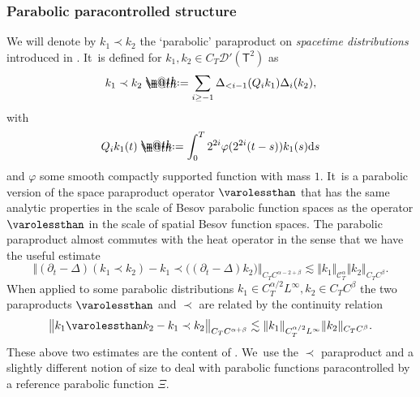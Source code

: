 \documentclass[10pt]{amsart}
\makeatletter
\theoremstyle{definition}
\newcommand{\mcD}{\mathcal{D}}
\newcommand{\scrC}{\ensuremath{\mathscr{C}}}
\newcommand*{\defeq}{\mathrel{\rlap{%
\raisebox{0.3ex}{$\m@th\cdot$}}%
\raisebox{-0.3ex}{$\m@th\cdot$}}%
=}
\newcommand{\dd}{\textup{d}}
\newcommand{\norme}[1]{\Vert #1 \Vert}
\makeatother
\begin{document}
\subsubsection{Parabolic paracontrolled structure} We will denote by $k_1\prec k_2$ the `parabolic' paraproduct on {\it spacetime distributions} introduced in \cite[\S5]{GIP}. It~is defined for $k_1,k_2\in C_T\mcD'(\mathsf{T}^2)$ as\vspace*{-3pt}
\[
k_1\prec k_2 \defeq \sum_{i\geq -1} \Delta_{<i-1}(Q_ik_1)\Delta_i(k_2),
\]
with\vspace*{-6pt}\enlargethispage{.5\baselineskip}
\[Q_ik_1(t) \defeq \int_0^T 2^{2i}\varphi(2^{2i}(t-s))k_1(s)\dd s
\]
and $\varphi$ some smooth compactly supported function with mass $1$. It~is a parabolic version of the space paraproduct operator $\varolessthan$ that has the same analytic properties in the scale of Besov parabolic function spaces as the operator $\varolessthan$ in the scale of spatial Besov function spaces. The parabolic paraproduct almost commutes with the heat operator in the sense that we have the useful estimate\vspace*{-3pt}
\[
\big\Vert (\partial_t-\Delta)(k_1\prec k_2) - k_1 \prec \bigl((\partial_t-\Delta)k_2\bigr)\big\Vert_{C_TC^{\alpha-2+\beta}} \lesssim \norme{k_1}_{\scrC^\alpha_T} \norme{k_2}_{C_TC^\beta}.
\]
When applied to some parabolic distributions $k_1\in C_T^{\alpha/2}L^\infty, k_2\in C_TC^\beta$ the two paraproducts $\varolessthan$ and $\prec$ are related by the continuity relation\vspace*{-3pt}
\begin{equation} \label{continuityrelation}
\big\Vert k_1\varolessthan k_2 - k_1 \prec k_2\big\Vert_{C_TC^{\alpha+\beta}} \lesssim \norme{k_1}_{C_T^{\alpha/2}L^\infty} \norme{k_2}_{C_TC^\beta}.
\end{equation}
These above two estimates are the content of \cite[Lem.\,5.1]{GIP}. We~use the $\prec$ paraproduct and a slightly different notion of size to deal with parabolic functions paracontrolled by a reference parabolic function $\Xi$.
\end{document}
